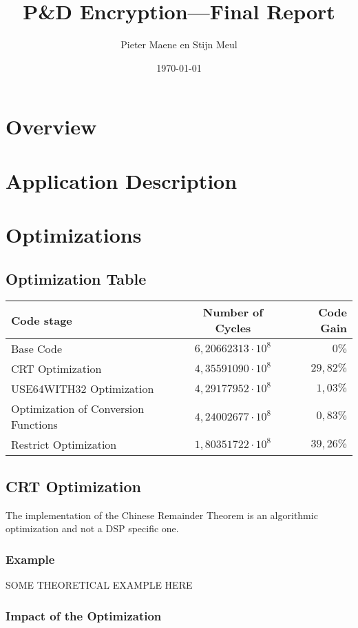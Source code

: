 \documentclass[a4paper]{article}
\title{P\&D Encryption---Final Report}
\author{Pieter Maene en Stijn Meul}
\date{\today}
\begin{document}
\maketitle

\section{Overview}

\section{Application Description}

\section{Optimizations}
\subsection{Optimization Table}
\begin{center}
	\begin{tabular}{| l | c | r |}
		\hline
		Code stage 								& Number of Cycles 				& Code Gain \\ \hline
		Base Code 								& $6,20662313 \cdot 10^{8}$ 	& $0\%$ 	\\
		CRT Optimization 						& $4,35591090 \cdot 10^{8}$		& $29,82\%$ \\
		USE64WITH32 Optimization 				& $4,29177952 \cdot 10^{8}$		& $1,03\%$	\\
		Optimization of Conversion Functions	& $4,24002677 \cdot 10^{8}$		& $0,83\%$	\\
		Restrict Optimization					& $1,80351722 \cdot 10^{8}$		& $39,26\%$ \\
		\hline
	\end{tabular}
\end{center}
\subsection{CRT Optimization}
	The implementation of the Chinese Remainder Theorem is an algorithmic optimization and not a DSP specific one. 
	\subsubsection{Example}
		SOME THEORETICAL EXAMPLE HERE
	\subsubsection{Impact of the Optimization}
\end{document}
